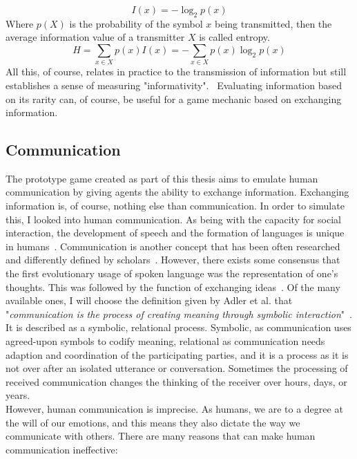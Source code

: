 \begin{equation*}
	I(x) = -\log_2 p(x)
\end{equation*}
Where $p(X)$ is the probability of the symbol $x$ being transmitted, then the average information value of a transmitter $X$ is called entropy.
\begin{equation*}
	H = \sum_{x \in X} p(x)I(x) = -\sum_{x \in X} p(x)\log_2 p(x)
\end{equation*}
All this, of course, relates in practice to the transmission of information but still establishes a sense of measuring "informativity".~\cite{Shannon1949} Evaluating information based on its rarity can, of course, be useful for a game mechanic based on exchanging information.
\subsection{Communication}
The prototype game created as part of this thesis aims to emulate human communication by giving agents the ability to exchange information. Exchanging information is, of course, nothing else than communication. In order to simulate this, I looked into human communication. As being with the capacity for social interaction, the development of speech and the formation of languages is unique in humans~\cite{Levinson2006}. Communication is another concept that has been often researched and differently defined by scholars~\cite{Littlejohn2010}. However, there exists some consensus that the first evolutionary usage of spoken language was the representation of one's thoughts. This was followed by the function of exchanging ideas~\cite{Ruben1985}. Of the many available ones, I will choose the definition given by Adler et al. that "\textit{communication is the process of creating meaning through symbolic interaction}"~\cite{Adler2016}. It is described as a symbolic, relational process. Symbolic, as communication uses agreed-upon symbols to codify meaning, relational as communication needs adaption and coordination of the participating parties, and it is a process as it is not over after an isolated utterance or conversation. Sometimes the processing of received communication changes the thinking of the receiver over hours, days, or years.~\cite{Adler2016}\\
However, human communication is imprecise. As humans, we are to a degree at the will of our emotions, and this means they also dictate the way we communicate with others. There are many reasons that can make human communication ineffective:
